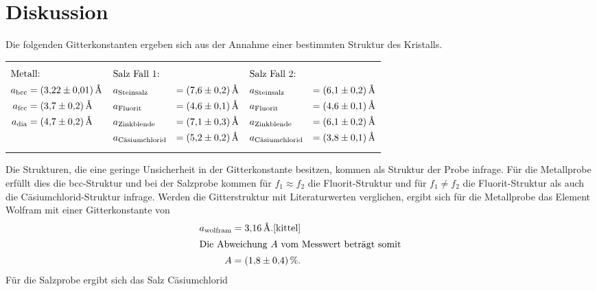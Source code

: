 \section{Diskussion}
\label{sec:Diskussion}
Die folgenden Gitterkonstanten ergeben sich aus der Annahme einer
bestimmten Struktur des Kristalls.
\begin{table}
  \centering
\begin{tabular}{p{} p{} p{} }
{\begin{align*}
\intertext{Metall:}
a_\mathrm{bcc}&=\SI{3.22(1)}{\angstrom}\\
a_\mathrm{fcc}&=\SI{3.7(2)}{\angstrom}\\
a_\mathrm{dia}&=\SI{4.7(2)}{\angstrom}
\end{align*}}
&
{\begin{align*}
\intertext{Salz Fall 1:}
&a_{\text{Steinsalz}}&=\SI{7.6(2)}{\angstrom}\\
&a_{\text{Fluorit}}&=\SI{4.6(1)}{\angstrom}\\
&a_{\text{Zinkblende}}&=\SI{7.1(3)}{\angstrom}\\
&a_{\text{Cäsiumchlorid}} &=\SI{5.2(2)}{\angstrom}
\end{align*}}
&
{\begin{align*}
\intertext{Salz Fall 2:}
&a_{\text{Steinsalz}}&=\SI{6.1(2)}{\angstrom}\\
&a_{\text{Fluorit}}&=\SI{4.6(1)}{\angstrom}\\
&a_{\text{Zinkblende}}&=\SI{6.1(2)}{\angstrom}\\
&a_{\text{Cäsiumchlorid}} &=\SI{3.8(1)}{\angstrom}
\end{align*}}
\end{tabular}
\end{table}
Die Strukturen, die eine geringe Unsicherheit in der Gitterkonstante besitzen,
kommen als Struktur der Probe infrage.
Für die Metallprobe erfüllt dies die bcc-Struktur
und bei der Salzprobe kommen für $f_1 \approx f_2$
die Fluorit-Struktur und für $f_1 \neq f_2$
die Fluorit-Struktur als auch die Cäsiumchlorid-Struktur
infrage.
Werden die Gitterstruktur mit Literaturwerten
verglichen, ergibt sich für die Metallprobe das Element
Wolfram mit einer Gitterkonstante von
\begin{align*}
a_{\text{wolfram}}=\SI{3.16}{\angstrom}.\text{\cite{kittel}} \\
\intertext{Die Abweichung $A$ vom Messwert beträgt somit}
A=\SI{1.8(4)}{\percent}.
\end{align*}
Für die Salzprobe ergibt sich das Salz Cäsiumchlorid
